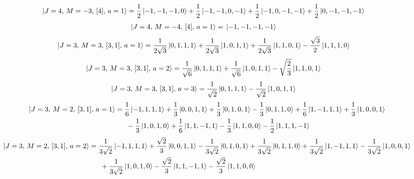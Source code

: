 \documentclass{article}
\begin{document}
\begin{equation*}
\begin{aligned}
\ket{J=4,\,M=-3,\,[4],\,a=1} = \; &\frac{1}{2} \ket{-1,-1,-1,0} + \frac{1}{2} \ket{-1,-1,0,-1} + \frac{1}{2} \ket{-1,0,-1,-1} + \frac{1}{2} \ket{0,-1,-1,-1}
\end{aligned}
\end{equation*}
\begin{equation*}
\begin{aligned}
\ket{J=4,\,M=-4,\,[4],\,a=1} = \; &\ket{-1,-1,-1,-1}
\end{aligned}
\end{equation*}
\begin{equation*}
\begin{aligned}
\ket{J=3,\,M=3,\,[3,1],\,a=1} = \; &\frac{1}{2\sqrt{3}} \ket{0,1,1,1} + \frac{1}{2\sqrt{3}} \ket{1,0,1,1} + \frac{1}{2\sqrt{3}} \ket{1,1,0,1} - \frac{\sqrt{3}}{2} \ket{1,1,1,0}
\end{aligned}
\end{equation*}
\begin{equation*}
\begin{aligned}
\ket{J=3,\,M=3,\,[3,1],\,a=2} = \; &\frac{1}{\sqrt{6}} \ket{0,1,1,1} + \frac{1}{\sqrt{6}} \ket{1,0,1,1} - \sqrt{\frac{2}{3}} \ket{1,1,0,1}
\end{aligned}
\end{equation*}
\begin{equation*}
\begin{aligned}
\ket{J=3,\,M=3,\,[3,1],\,a=3} = \; &\frac{1}{\sqrt{2}} \ket{0,1,1,1} - \frac{1}{\sqrt{2}} \ket{1,0,1,1}
\end{aligned}
\end{equation*}
{\small
\begin{equation*}
\begin{aligned}
\ket{J=3,\,M=2,\,[3,1],\,a=1} = \; &\frac{1}{6} \ket{-1,1,1,1} + \frac{1}{3} \ket{0,0,1,1} + \frac{1}{3} \ket{0,1,0,1} - \frac{1}{3} \ket{0,1,1,0} + \frac{1}{6} \ket{1,-1,1,1} + \frac{1}{3} \ket{1,0,0,1} \\
  & \; - \frac{1}{3} \ket{1,0,1,0} + \frac{1}{6} \ket{1,1,-1,1} - \frac{1}{3} \ket{1,1,0,0} - \frac{1}{2} \ket{1,1,1,-1}
\end{aligned}
\end{equation*}}
{\small
\begin{equation*}
\begin{aligned}
\ket{J=3,\,M=2,\,[3,1],\,a=2} = \; &\frac{1}{3\sqrt{2}} \ket{-1,1,1,1} + \frac{\sqrt{2}}{3} \ket{0,0,1,1} - \frac{1}{3\sqrt{2}} \ket{0,1,0,1} + \frac{1}{3\sqrt{2}} \ket{0,1,1,0} + \frac{1}{3\sqrt{2}} \ket{1,-1,1,1} - \frac{1}{3\sqrt{2}} \ket{1,0,0,1} \\
  & \; + \frac{1}{3\sqrt{2}} \ket{1,0,1,0} - \frac{\sqrt{2}}{3} \ket{1,1,-1,1} - \frac{\sqrt{2}}{3} \ket{1,1,0,0}
\end{aligned}
\end{equation*}}
\end{document}
